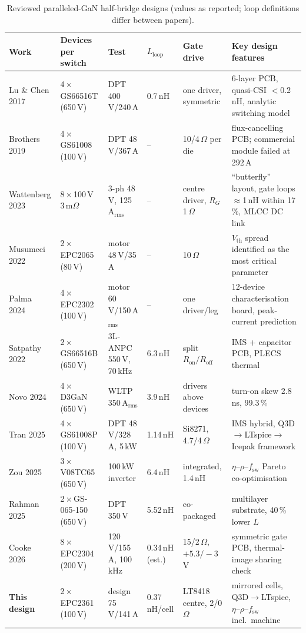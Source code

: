 \documentclass[10pt,a4paper]{article}
\begin{document}
\begin{table}[H]\centering\footnotesize
\caption{Reviewed paralleled-GaN half-bridge designs (values as reported; loop definitions differ between papers).}\label{tab:sota}
\setlength{\tabcolsep}{3pt}\begin{tabular}{@{}L{3.0cm}L{2.5cm}L{2.2cm}L{1.4cm}L{2.2cm}L{5.0cm}@{}}\toprule
Work & Devices per switch & Test & $L_\mathrm{loop}$ & Gate drive & Key design features \\\midrule
Lu \& Chen 2017~\cite{lu2017} & 4\,$\times$\,GS66516T (650\,V) & DPT 400\,V/240\,A & 0.7\,nH & one driver, symmetric & 6-layer PCB, quasi-CSI $<$0.2\,nH, analytic switching model \\
Brothers 2019~\cite{brothers2019} & 4\,$\times$\,GS61008 (100\,V) & DPT 48\,V/367\,A & -- & 10/4\,$\Omega$ per die & flux-cancelling PCB; commercial module failed at 292\,A \\
Wattenberg 2023~\cite{wattenberg2023} & 8\,$\times$\,100\,V 3\,m$\Omega$ & 3-ph 48\,V, 125\,A$_\mathrm{rms}$ & -- & centre driver, $R_G$ 1\,$\Omega$ & ``butterfly'' layout, gate loops $\approx$1\,nH within 17\,\%, MLCC DC link \\
Musumeci 2022~\cite{musumeci2022} & 2\,$\times$\,EPC2065 (80\,V) & motor 48\,V/35\,A & -- & 10\,$\Omega$ & $V_\mathrm{th}$ spread identified as the most critical parameter \\
Palma 2024~\cite{palma2024} & 4\,$\times$\,EPC2302 (100\,V) & motor 60\,V/150\,A$_\mathrm{rms}$ & -- & one driver/leg & 12-device characterisation board, peak-current prediction \\
Satpathy 2022~\cite{satpathy2022} & 2\,$\times$\,GS66516B (650\,V) & 3L-ANPC 550\,V, 70\,kHz & 6.3\,nH & split $R_\mathrm{on}/R_\mathrm{off}$ & IMS + capacitor PCB, PLECS thermal \\
Novo 2024~\cite{novo2024} & 4\,$\times$\,D3GaN (650\,V) & WLTP 350\,A$_\mathrm{rms}$ & 3.9\,nH & drivers above devices & turn-on skew 2.8\,ns, 99.3\,\% \\
Tran 2025~\cite{tran2025} & 4\,$\times$\,GS61008P (100\,V) & DPT 48\,V/328\,A, 5\,kW & 1.14\,nH & Si8271, 4.7/4\,$\Omega$ & IMS hybrid, Q3D$\to$LTspice$\to$Icepak framework \\
Zou 2025~\cite{zou2025} & 3\,$\times$\,V08TC65 (650\,V) & 100\,kW inverter & 6.4\,nH & integrated, 1.4\,nH & $\eta$--$\rho$--$f_\mathrm{sw}$ Pareto co-optimisation \\
Rahman 2025~\cite{rahman2025} & 2\,$\times$\,GS-065-150 (650\,V) & DPT 350\,V & 5.52\,nH & co-packaged & multilayer substrate, 40\,\% lower $L$ \\
Cooke 2026~\cite{cooke2026} & 8\,$\times$\,EPC2304 (200\,V) & 120\,V/155\,A, 100\,kHz & 0.34\,nH (est.) & 15/2\,$\Omega$, $+5.3/-3$\,V & symmetric gate PCB, thermal-image sharing check \\
\textbf{This design} & 2\,$\times$\,EPC2361 (100\,V) & design 75\,V/141\,A & 0.37\,nH/cell & LT8418 centre, 2/0\,$\Omega$ & mirrored cells, Q3D$\to$LTspice, $\eta$--$\rho$--$f_\mathrm{sw}$ incl.\ machine \\
\bottomrule\end{tabular}\end{table}
\end{document}
